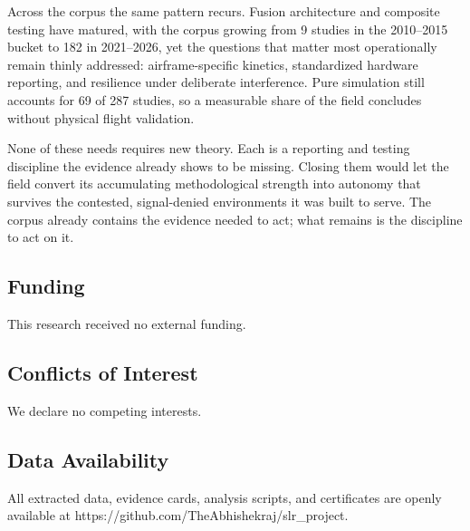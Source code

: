\documentclass[conference]{IEEEtran}
\begin{document}
Across the corpus the same pattern recurs. Fusion architecture and composite testing have matured, with the corpus growing from 9 studies in the 2010–2015 bucket to 182 in 2021–2026, yet the questions that matter most operationally remain thinly addressed: airframe-specific kinetics, standardized hardware reporting, and resilience under deliberate interference. Pure simulation still accounts for 69 of 287 studies, so a measurable share of the field concludes without physical flight validation.


None of these needs requires new theory. Each is a reporting and testing discipline the evidence already shows to be missing. Closing them would let the field convert its accumulating methodological strength into autonomy that survives the contested, signal-denied environments it was built to serve. The corpus already contains the evidence needed to act; what remains is the discipline to act on it.


\subsection{Funding}


This research received no external funding.


\subsection{Conflicts of Interest}


We declare no competing interests.


\subsection{Data Availability}


All extracted data, evidence cards, analysis scripts, and certificates are openly available at https://github.com/TheAbhishekraj/slr\_project.



\nocite{*}


\end{document}
